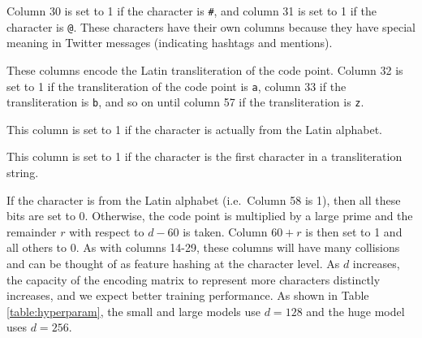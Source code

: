 \documentclass[sigconf,anonymous,review]{acmart}
\newcommand{\str}[1]{\texttt{#1}}
\begin{document}
\begin{description}
\begin{description}[font=\normalfont\itshape]
\item[Columns 30-31:]
    Column 30 is set to 1 if the character is \str{\#},
    and column 31 is set to 1 if the character is \str{@}.
    These characters have their own columns because they have special meaning in Twitter messages
    (indicating hashtags and mentions).

\item[Columns 32-57:]
    These columns encode the Latin transliteration of the code point.
    Column 32 is set to 1 if the transliteration of the code point is \str{a},
    column 33 if the transliteration is \str{b},
    and so on until column 57 if the transliteration is \str{z}.

\item[Column 58:]
    This column is set to 1 if the character is actually from the Latin alphabet.

\item[Column 59:]
    This column is set to 1 if the character is the first character in a transliteration string.

\item[Columns 60-$d$:]
    If the character is from the Latin alphabet (i.e.\ Column 58 is 1), 
    then all these bits are set to 0.
    Otherwise, the code point is multiplied by a large prime and the remainder $r$ with respect to $d-60$ is taken.
    Column $60+r$ is then set to 1 and all others to 0.
    As with columns 14-29,
    these columns will have many collisions and can be thought of as feature hashing \citep{weinberger2009feature} at the character level.
    As $d$ increases, the capacity of the encoding matrix to represent more characters distinctly increases, and we expect better training performance.
    As shown in Table \ref{table:hyperparam}, the small and large models use $d=128$ and the huge model uses $d=256$.
\end{description}


\end{description}
\end{document}
